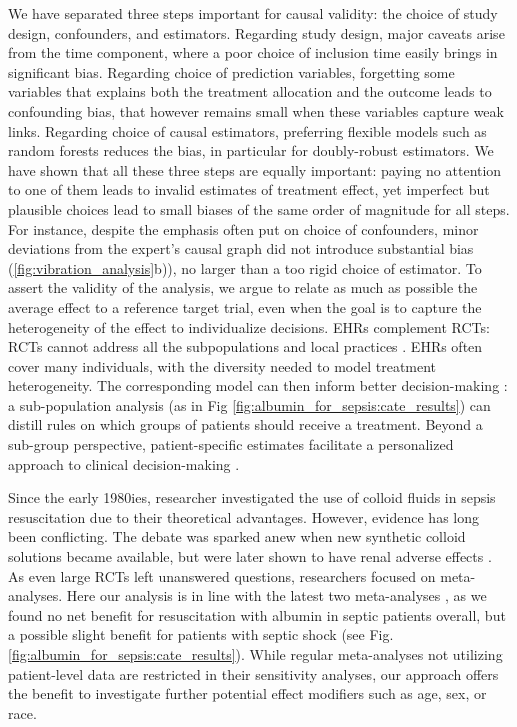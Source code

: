 \documentclass[10pt,letterpaper]{article}
\begin{document}
We have separated three steps important for causal validity: the choice
of study design, confounders, and estimators.
%
Regarding study design, major caveats arise from the time component,
where a poor choice of inclusion time easily brings in significant bias. Regarding choice of prediction
variables, forgetting some variables that explains both the treatment
allocation and the outcome leads to confounding bias, that however
remains small when these
variables capture weak links. Regarding choice of causal estimators,
preferring flexible models such as random forests reduces the bias, in
particular for doubly-robust estimators.
%
We have shown that all these three steps are equally important: paying no
attention to one of them leads to invalid estimates of treatment effect,
yet imperfect but plausible choices lead to small biases of the same
order of magnitude for all steps.
%
For instance, despite the emphasis often put on choice of confounders,
minor deviations from the expert's causal graph did not introduce
substantial bias (\ref{fig:vibration_analysis}b)), no larger than a too
rigid choice of estimator.
To assert the validity of the analysis, we argue to relate as much as
possible the average effect to a reference target trial, even when the
goal is to capture the heterogeneity of the effect to individualize
decisions.
EHRs complement RCTs: RCTs cannot address all the
subpopulations and local practices
\cite{travers2007external,kennedy2015literature}. EHRs often cover many
individuals, with the diversity needed to model treatment
heterogeneity. The corresponding model can then inform better
decision-making \cite{prosperi2020causal}: a sub-population analysis  (as in Fig
\ref{fig:albumin_for_sepsis:cate_results}) can distill rules on which groups
of patients should receive a treatment. Beyond a sub-group perspective,
patient-specific estimates facilitate a personalized approach
to clinical decision-making \cite{kent2018personalized}.

Since the early 1980ies, researcher investigated the use of colloid fluids in
sepsis resuscitation due to their theoretical advantages. However, evidence has
long been conflicting. The debate was sparked anew when new synthetic colloid
solutions became available, but were later shown to have renal adverse effects
\cite{xu2014comparison}. As even large RCTs left unanswered questions,
researchers focused on meta-analyses. Here our analysis is in line with the
latest two meta-analyses \cite{xu2014comparison,li2020resuscitation}, as we
found no net benefit for resuscitation with albumin in septic patients overall,
but a possible slight benefit for patients with septic shock (see Fig.
\ref{fig:albumin_for_sepsis:cate_results}). While regular meta-analyses not
utilizing patient-level data are restricted in their sensitivity analyses, our
approach offers the benefit to investigate further potential effect modifiers
such as age, sex, or race.
\end{document}
